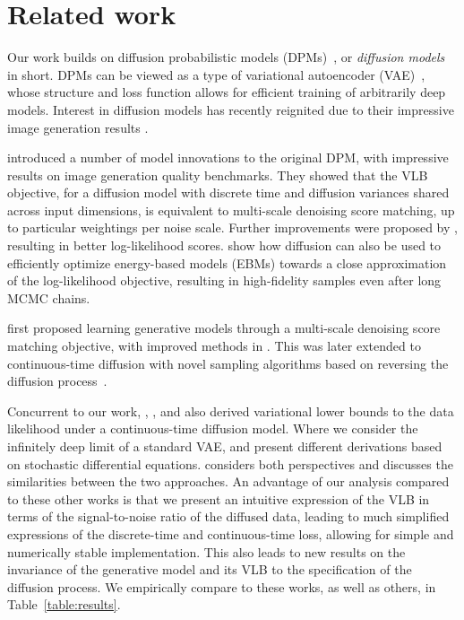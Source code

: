 \documentclass{article}
\begin{document}
\section{Related work}
\label{sec:relatedwork}

Our work builds on diffusion probabilistic models (DPMs)~\citep{sohl2015deep}, or \emph{diffusion models} in short. DPMs can be viewed as a type of variational autoencoder (VAE)~\citep{kingma2013auto,rezende2014stochastic}, whose structure and loss function allows for efficient training of arbitrarily deep models. Interest in diffusion models has recently reignited due to their impressive image generation results \citep{ho2020denoising, song2020improved}.

\citet{ho2020denoising} introduced a number of model innovations to the original DPM, with impressive results on image generation quality benchmarks. They showed that the VLB objective, for a diffusion model with discrete time and diffusion variances shared across input dimensions, is equivalent to multi-scale denoising score matching, up to particular weightings per noise scale. Further improvements were proposed by \citet{nichol2021improved}, resulting in better log-likelihood scores. \citet{gao2020learning} show how diffusion can also be used to efficiently optimize energy-based models (EBMs) towards a close approximation of the log-likelihood objective, resulting in high-fidelity samples even after long MCMC chains.

\citet{song2019generative} first proposed learning generative models through a multi-scale denoising score matching objective, with improved methods in \citet{song2020improved}. This was later extended to continuous-time diffusion with novel sampling algorithms based on reversing the diffusion process~\citep{song2020score}. 

%
%


%

Concurrent to our work, \cite{song2021maximum}, \cite{huang2021variational}, and \cite{vahdat2021score} also derived variational lower bounds to the data likelihood under a continuous-time diffusion model. Where we consider the infinitely deep limit of a standard VAE, \cite{song2021maximum} and \cite{vahdat2021score} present different derivations based on stochastic differential equations. \cite{huang2021variational} considers both perspectives and discusses the similarities between the two approaches. An advantage of our analysis compared to these other works is that we present an intuitive expression of the VLB in terms of the signal-to-noise ratio of the diffused data, leading to much simplified expressions of the discrete-time and continuous-time loss, allowing for simple and numerically stable implementation. This also leads to new results on the invariance of the generative model and its VLB to the specification of the diffusion process. We empirically compare to these works, as well as others, in Table~\ref{table:results}.
\end{document}
